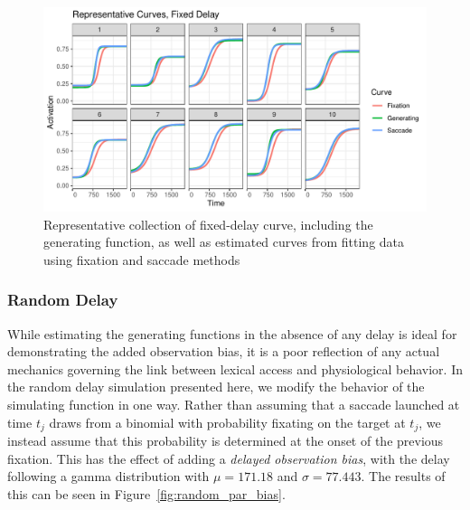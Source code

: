 \documentclass{article}
\begin{document}
\begin{figure}[h]
\centering
\includegraphics{fixed_pb_curves.pdf}
\caption{Representative collection of fixed-delay curve, including  the generating function, as well as estimated curves from fitting data using fixation and saccade methods}
\label{fig:fixed_pb_curves}
\end{figure}


\subsubsection{Random Delay}

While estimating the generating functions in the absence of any delay is ideal for demonstrating the added observation bias, it is a poor reflection of any actual mechanics governing the link between lexical access and physiological behavior. In the random delay simulation presented here, we modify the behavior of the simulating function in one way. Rather than assuming that a saccade launched at time $t_j$ draws from a binomial with probability fixating on the target at $t_j$, we instead assume that this probability is determined at the onset of the previous fixation. This has the effect of adding a \textit{delayed observation bias}, with the delay following a gamma distribution with $\mu = 171.18$ and $\sigma = 77.443$. The results of this can be seen in Figure~\ref{fig:random_par_bias}.
\end{document}
